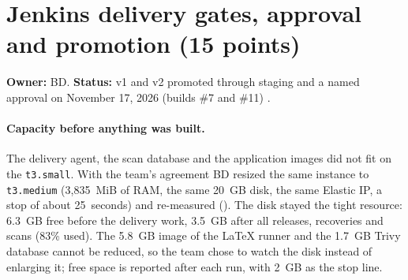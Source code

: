 \begin{longlisting}
\inputminted[fontsize=\scriptsize]{text}{evidence/174-ansible-versions-syntax-check-rendered-compose-sd-2026-11-12.txt}
\caption{Ansible and collection versions, target prerequisites, syntax check and the rendered template, November 12, 2026 (real output).}
\label{Listing:E174}
\end{longlisting}

\begin{longlisting}
\inputminted[fontsize=\scriptsize]{text}{evidence/175-deploy-ssh-path-from-agent-network-host-key-sd-2026-11-12.txt}
\caption{The deploy SSH path over the Docker bridge and the pinned host key, November 12, 2026 (real output).}
\label{Listing:E175}
\end{longlisting}



\section{Jenkins delivery gates, approval and promotion (15 points)}\label{Section:deliveryJenkins}
\textbf{Owner:} BD. \textbf{Status:} v1 and v2 promoted through staging and a named approval on November 17, 2026 (builds \#7 and \#11) \StatusPass.

\paragraph{Capacity before anything was built.} The delivery agent, the scan database and the application images did not fit on the
\texttt{t3.small}. With the team's agreement BD resized the same instance to \texttt{t3.medium} (3,835~MiB of RAM, the same 20~GB disk,
the same Elastic IP, a stop of about 25~seconds) and re-measured (). The disk stayed the tight resource: 6.3~GB free before the
delivery work, 3.5~GB after all releases, recoveries and scans (83\% used). The 5.8~GB image of the LaTeX runner and the 1.7~GB Trivy database cannot
be reduced, so the team chose to watch the disk instead of enlarging it; free space is reported after each run, with 2~GB as the stop line.

